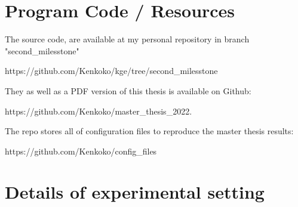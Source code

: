 \appendix



\chapter{Program Code / Resources}
\label{cha:appendix-a}

The source code, are available at my personal repository in branch "second\_milesstone"

\quad https://github.com/Kenkoko/kge/tree/second\_milesstone

\noindent They as well as a PDF version of this thesis is available on Github:  

\quad https://github.com/Kenkoko/master\_thesis\_2022.

\noindent The repo stores all of configuration files to reproduce the master thesis results: 

\quad https://github.com/Kenkoko/config\_files

\chapter{Details of experimental setting}
\label{cha:details of experimental setting}

